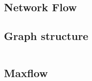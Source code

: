 \begin{multicols}{2}
\begin{spacing}{0.6}
			\columnbreak
			\section{Network Flow}
				\subsection{Graph structure}
					\inputminted{cpp}{Network/network.cpp}
				\subsection{Maxflow}
					\inputminted{cpp}{Network/dinic.cpp}
					\inputminted{cpp}{Network/isap.cpp}
			

		\end{spacing}
		\endgroup
	\end{multicols}

